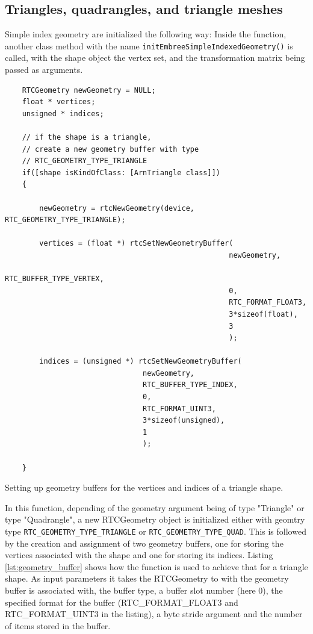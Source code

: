 \subsection{Triangles, quadrangles, and triangle meshes}
Simple index geometry are initialized the following way: Inside the  function, another class method with the name \texttt{initEmbreeSimpleIndexedGeometry()} is called, with the shape object the vertex set, and the transformation matrix being passed as arguments. 

\begin{listing} 
	\begin{lstlisting}
	RTCGeometry newGeometry = NULL;
	float * vertices;
	unsigned * indices;
	
	// if the shape is a triangle, 
	// create a new geometry buffer with type
	// RTC_GEOMETRY_TYPE_TRIANGLE
	if([shape isKindOfClass: [ArnTriangle class]]) 
	{
	
		newGeometry = rtcNewGeometry(device, RTC_GEOMETRY_TYPE_TRIANGLE);
		
		vertices = (float *) rtcSetNewGeometryBuffer(
													newGeometry,
													RTC_BUFFER_TYPE_VERTEX,
													0,
													RTC_FORMAT_FLOAT3,
													3*sizeof(float),
													3
													);
		
		indices = (unsigned *) rtcSetNewGeometryBuffer(
		                        newGeometry,
		                        RTC_BUFFER_TYPE_INDEX,
		                        0,
		                        RTC_FORMAT_UINT3,
		                        3*sizeof(unsigned),
		                        1
		                        );
	
	}
	\end{lstlisting}
	\caption{Setting up geometry buffers for the vertices and indices of a triangle shape.}
	\label{lst:geometry_buffer}
\end{listing}

In this function, depending of the geometry argument being of type "Triangle" or type "Quadrangle", a new RTCGeometry object is initialized either with geomtry type \texttt{RTC\_GEOMETRY\_TYPE\_TRIANGLE} or \texttt{RTC\_GEOMETRY\_TYPE\_QUAD}. This is followed by the creation and assignment of two geometry buffers, one for storing the vertices associated with the shape and one for storing its indices. Listing \ref{lst:geometry_buffer} shows how the function  is used to achieve that for a triangle shape. As input parameters it takes the RTCGeometry to with the geometry buffer is associated with, the buffer type, a buffer slot number (here 0), the specified format for the buffer (RTC\_FORMAT\_FLOAT3 and RTC\_FORMAT\_UINT3 in the listing), a byte stride argument and the number of items stored in the buffer. 

